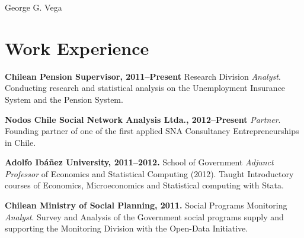 \documentclass[letterpaper, 12pt]{article}
\def\name{George G. Vega}
\renewenvironment{itemize}{
  \begin{list}{}{
    \setlength{\leftmargin}{0.45cm}
  }
}{
  \end{list}
}
\begin{document}
{\huge \name}


\section*{Work Experience}

\begin{itemize}
\item \textbf{Chilean Pension Supervisor, 2011--Present} Research Division \emph{Analyst}.
Conducting research and statistical analysis on the Unemployment Insurance System and the Pension System.
\item \textbf{Nodos Chile Social Network Analysis Ltda., 2012--Present} \emph{Partner}.
Founding partner of one of the first applied SNA Consultancy Entrepreneurships in Chile.
\item \textbf{Adolfo Ib\'a\~nez University, 2011--2012.} School of Government \emph{Adjunct Professor} of Economics and Statistical Computing (2012). 
Taught Introductory courses of Economics, Microeconomics and Statistical computing with Stata.
\item \textbf{Chilean Ministry of Social Planning, 2011.} Social Programs Monitoring \emph{Analyst}.
Survey and Analysis of the Government social programs supply and supporting the Monitoring Division with the Open-Data Initiative.
\end{itemize}
\end{document}
